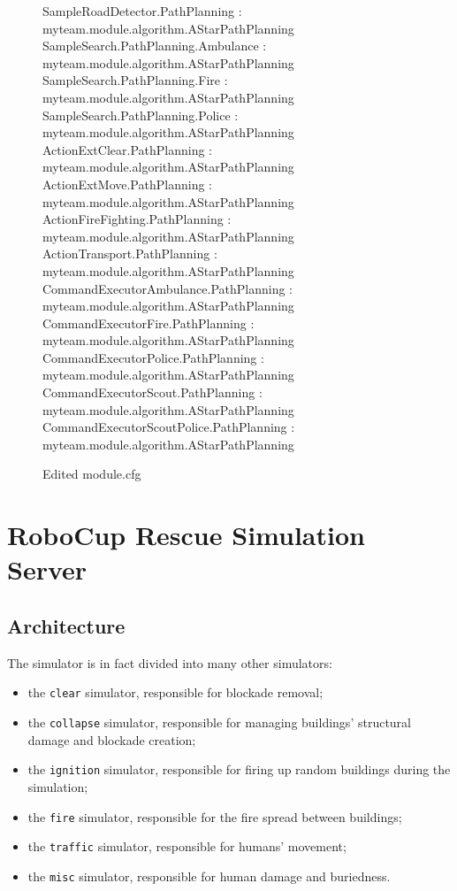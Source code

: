 \documentclass{article}
\begin{document}
\begin{figure}[ht]
 \begin{center}
\begin{screen}
{\ttfamily
SampleRoadDetector.PathPlanning : myteam.module.algorithm.AStarPathPlanning\\
SampleSearch.PathPlanning.Ambulance : myteam.module.algorithm.AStarPathPlanning\\
SampleSearch.PathPlanning.Fire : myteam.module.algorithm.AStarPathPlanning\\
SampleSearch.PathPlanning.Police : myteam.module.algorithm.AStarPathPlanning\\
ActionExtClear.PathPlanning : myteam.module.algorithm.AStarPathPlanning\\
ActionExtMove.PathPlanning : myteam.module.algorithm.AStarPathPlanning\\
ActionFireFighting.PathPlanning : myteam.module.algorithm.AStarPathPlanning\\
ActionTransport.PathPlanning : myteam.module.algorithm.AStarPathPlanning\\
CommandExecutorAmbulance.PathPlanning : myteam.module.algorithm.AStarPathPlanning\\
CommandExecutorFire.PathPlanning : myteam.module.algorithm.AStarPathPlanning\\
CommandExecutorPolice.PathPlanning : myteam.module.algorithm.AStarPathPlanning\\
CommandExecutorScout.PathPlanning : myteam.module.algorithm.AStarPathPlanning\\
CommandExecutorScoutPolice.PathPlanning : myteam.module.algorithm.AStarPathPlanning
}
\end{screen}
  \caption{Edited module.cfg}
  \label{fig:edited_module.cfg}
 \end{center}
\end{figure}
\newpage
\section{RoboCup Rescue Simulation Server}
\subsection{Architecture}
The simulator is in fact divided into many other simulators:
\begin{itemize}
  \item the \texttt{clear} simulator, responsible for blockade removal;
  \item the \texttt{collapse} simulator, responsible for managing buildings' structural damage and blockade creation;
  \item the \texttt{ignition} simulator, responsible for firing up random buildings during the simulation;
  \item the \texttt{fire} simulator, responsible for the fire spread between buildings;
  \item the \texttt{traffic} simulator, responsible for humans' movement;
  \item the \texttt{misc} simulator, responsible for human damage and buriedness.
\end{itemize}
\end{document}

